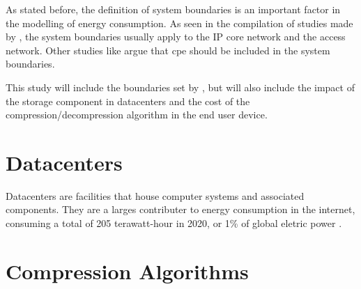 As stated before, the definition of system boundaries is an important factor in the modelling of energy consumption. As seen in the compilation of studies made by \citet{Aslan2018}, the system boundaries usually apply to the IP core network and the access network. Other studies like \citet{Coroama2014} argue that \ac{cpe} should be included in the system boundaries.

This study will include the boundaries set by \citet{Coroama2014}, but will also include the impact of the storage component in datacenters and the cost of the compression/decompression algorithm in the end user device.

\section{Datacenters}

Datacenters are facilities that house computer systems and associated components. They are a larges contributer to energy consumption in the internet, consuming a total of 205 \ac{terawatt-hour} in 2020, or 1\% of global eletric power \citet{IEA2020}. 


\section{Compression Algorithms}